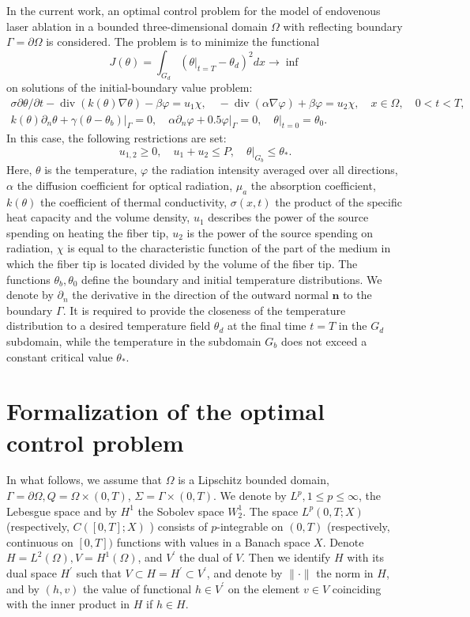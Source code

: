 \documentclass[10pt]{article}
\begin{document}
In the current work, an optimal control problem for the model of endovenous laser ablation in a bounded three-dimensional domain $\Omega$ with reflecting boundary $\Gamma=\partial \Omega$ is considered. The problem is to minimize the functional
$$
J(\theta)=\int_{G_{d}}\left(\left.\theta\right|_{t=T}-\theta_{d}\right)^{2} d x \rightarrow \inf
$$
on solutions of the initial-boundary value problem:
$$
\begin{gathered}
\sigma \partial \theta / \partial t-\operatorname{div}(k(\theta) \nabla \theta)-\beta \varphi=u_{1} \chi, \quad-\operatorname{div}(\alpha \nabla \varphi)+\beta \varphi=u_{2} \chi, \quad x \in \Omega, \quad 0<t<T, \\
k(\theta) \partial_{n} \theta+\left.\gamma\left(\theta-\theta_{b}\right)\right|_{\Gamma}=0, \quad \alpha \partial_{n} \varphi+\left.0.5 \varphi\right|_{\Gamma}=0,\left.\quad \theta\right|_{t=0}=\theta_{0} .
\end{gathered}
$$
In this case, the following restrictions are set:
$$
u_{1,2} \geq 0, \quad u_{1}+u_{2} \leq P,\left.\quad \theta\right|_{G_{b}} \leq \theta_{*} .
$$
Here, $\theta$ is the temperature, $\varphi$ the radiation intensity averaged over all directions, $\alpha$ the diffusion coefficient for optical radiation, $\mu_{a}$ the absorption coefficient, $k(\theta)$ the coefficient of thermal conductivity, $\sigma(x, t)$ the product of the specific heat capacity and the volume density, $u_{1}$ describes the power of the source spending on heating the fiber tip, $u_{2}$ is the power of the source spending on radiation, $\chi$ is equal to the characteristic function of the part of the medium in which the fiber tip is located divided by the volume of the fiber tip. The functions $\theta_{b}, \theta_{0}$ define the boundary and initial temperature distributions. We denote by $\partial_{n}$ the derivative in the direction of the outward normal $\mathbf{n}$ to the boundary $\Gamma$. It is required to provide the closeness of the temperature distribution to a desired temperature field $\theta_{d}$ at the final time $t=T$ in the $G_{d}$ subdomain, while the temperature in the subdomain $G_{b}$ does not exceed a constant critical value $\theta_{*}$.

\section{Formalization of the optimal control problem}
In what follows, we assume that $\Omega$ is a Lipschitz bounded domain, $\Gamma=\partial \Omega, Q=\Omega \times(0, T)$, $\Sigma=\Gamma \times(0, T)$. We denote by $L^{p}, 1 \leq p \leq \infty$, the Lebesgue space and by $H^{1}$ the Sobolev space $W_{2}^{1}$. The space $L^{p}(0, T ; X)$ (respectively, $C([0, T] ; X)$ ) consists of $p$-integrable on $(0, T)$ (respectively, continuous on $[0, T])$ functions with values in a Banach space $X$. Denote $H=L^{2}(\Omega), V=H^{1}(\Omega)$, and $V^{\prime}$ the dual of $V$. Then we identify $H$ with its dual space $H^{\prime}$ such that $V \subset H=H^{\prime} \subset V^{\prime}$, and denote by $\|\cdot\|$ the norm in $H$, and by $(h, v)$ the value of functional $h \in V^{\prime}$ on the element $v \in V$ coinciding with the inner product in $H$ if $h \in H$.
\end{document}

